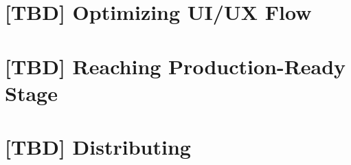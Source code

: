 \documentclass[12pt, a4paper, twoside]{extreport}
\begin{document}
\newpage
\section{[TBD] Optimizing UI/UX Flow}


\newpage
\section{[TBD] Reaching Production-Ready Stage}


\newpage
\section{[TBD] Distributing}




\thispagestyle{empty}



~
\end{document}
